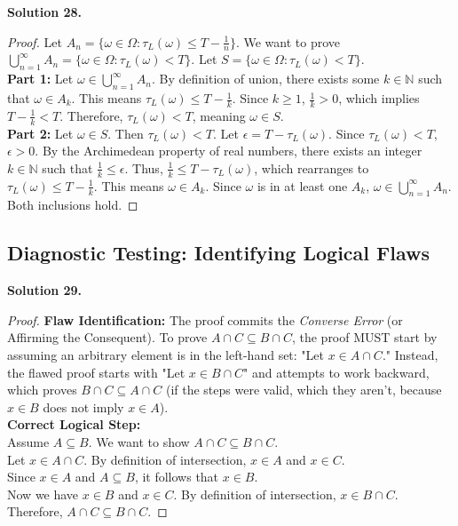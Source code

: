 \documentclass[11pt]{article}
\begin{document}
\noindent \textbf{Solution 28.}
\begin{proof}
Let $A_n = \{\omega \in \Omega : \tau_L(\omega) \le T - \frac{1}{n}\}$. We want to prove $\bigcup_{n=1}^\infty A_n = \{\omega \in \Omega : \tau_L(\omega) < T\}$. Let $S = \{\omega \in \Omega : \tau_L(\omega) < T\}$. \\
\textbf{Part 1:} Let $\omega \in \bigcup_{n=1}^\infty A_n$. By definition of union, there exists some $k \in \mathbb{N}$ such that $\omega \in A_k$. This means $\tau_L(\omega) \le T - \frac{1}{k}$. Since $k \ge 1$, $\frac{1}{k} > 0$, which implies $T - \frac{1}{k} < T$. Therefore, $\tau_L(\omega) < T$, meaning $\omega \in S$. \\
\textbf{Part 2:} Let $\omega \in S$. Then $\tau_L(\omega) < T$. Let $\epsilon = T - \tau_L(\omega)$. Since $\tau_L(\omega) < T$, $\epsilon > 0$. By the Archimedean property of real numbers, there exists an integer $k \in \mathbb{N}$ such that $\frac{1}{k} \le \epsilon$. Thus, $\frac{1}{k} \le T - \tau_L(\omega)$, which rearranges to $\tau_L(\omega) \le T - \frac{1}{k}$. This means $\omega \in A_k$. Since $\omega$ is in at least one $A_k$, $\omega \in \bigcup_{n=1}^\infty A_n$. \\
Both inclusions hold.
\end{proof}

\subsection{Diagnostic Testing: Identifying Logical Flaws}

\noindent \textbf{Solution 29.}
\begin{proof}
\textbf{Flaw Identification:} The proof commits the \textit{Converse Error} (or Affirming the Consequent). To prove $A \cap C \subseteq B \cap C$, the proof MUST start by assuming an arbitrary element is in the left-hand set: "Let $x \in A \cap C$." Instead, the flawed proof starts with "Let $x \in B \cap C$" and attempts to work backward, which proves $B \cap C \subseteq A \cap C$ (if the steps were valid, which they aren't, because $x \in B$ does not imply $x \in A$). \\
\textbf{Correct Logical Step:} \\
Assume $A \subseteq B$. We want to show $A \cap C \subseteq B \cap C$. \\
Let $x \in A \cap C$. By definition of intersection, $x \in A$ and $x \in C$. \\
Since $x \in A$ and $A \subseteq B$, it follows that $x \in B$. \\
Now we have $x \in B$ and $x \in C$. By definition of intersection, $x \in B \cap C$. \\
Therefore, $A \cap C \subseteq B \cap C$.
\end{proof}
\end{document}

